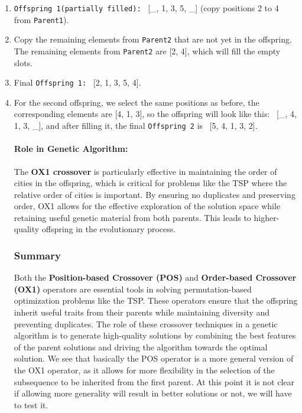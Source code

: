 \documentclass[12pt]{article}
\begin{document}
\begin{enumerate}
    \item \texttt{Offspring 1(partially filled):} \ [\_, 1, 3, 5, \_] (copy positions 2 to 4 from \texttt{Parent1}).
    \item Copy the remaining elements from \texttt{Parent2} that are not yet in the offspring. The remaining elements from \texttt{Parent2} are [2, 4], which will fill the empty slots.
    \item Final \texttt{Offspring 1:} \ [2, 1, 3, 5, 4].
    \item For the second offspring, we select the same positions as before, the corresponding elements are [4, 1, 3], so the offspring will look like this: \ [\_, 4, 1, 3, \_], and after filling it, the final \texttt{Offspring 2} is \ [5, 4, 1, 3, 2].

\paragraph{Role in Genetic Algorithm:}

The \textbf{OX1 crossover} is particularly effective in maintaining the order of cities in the offspring, which is critical for problems like the TSP where the relative order of cities is important. By ensuring no duplicates and preserving order, OX1 allows for the effective exploration of the solution space while retaining useful genetic material from both parents. This leads to higher-quality offspring in the evolutionary process.

\subsubsection{Summary}

Both the \textbf{Position-based Crossover (POS)} and \textbf{Order-based Crossover (OX1)} operators are essential tools in solving permutation-based optimization problems like the TSP. These operators ensure that the offspring inherit useful traits from their parents while maintaining diversity and preventing duplicates. The role of these crossover techniques in a genetic algorithm is to generate high-quality solutions by combining the best features of the parent solutions and driving the algorithm towards the optimal solution. We see that basically the POS operator is a more general version of the OX1 operator, as it allows for more flexibility in the selection of the subsequence to be inherited from the first parent. At this point it is not clear if allowing more generality will result in better solutions or not, we will have to test it.


\end{enumerate}
\end{document}
